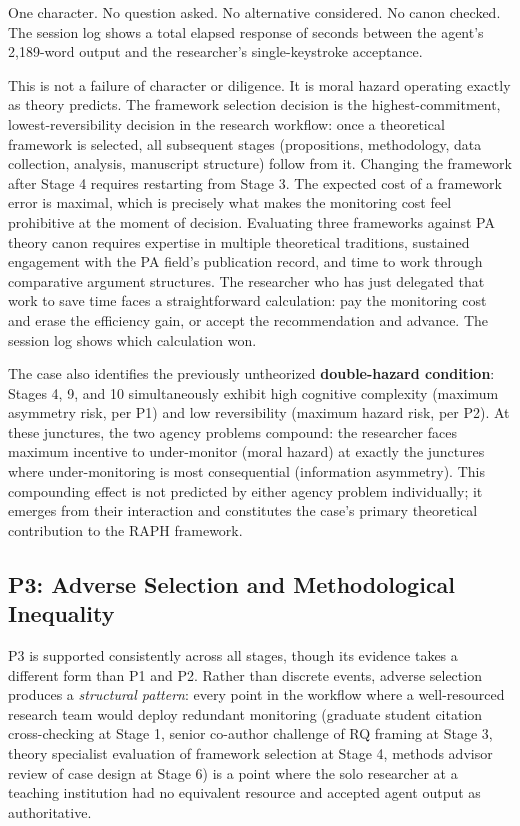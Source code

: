 \documentclass[12pt]{article}
\begin{document}
One character. No question asked. No alternative considered. No canon checked. The session
log shows a total elapsed response of seconds between the agent's 2,189-word output and
the researcher's single-keystroke acceptance.

This is not a failure of character or diligence. It is moral hazard operating exactly as
theory predicts. The framework selection decision is the highest-commitment,
lowest-reversibility decision in the research workflow: once a theoretical framework is
selected, all subsequent stages (propositions, methodology, data collection, analysis,
manuscript structure) follow from it. Changing the framework after Stage 4 requires
restarting from Stage 3. The expected cost of a framework error is maximal, which is
precisely what makes the monitoring cost feel prohibitive at the moment of decision.
Evaluating three frameworks against PA theory canon requires expertise in multiple
theoretical traditions, sustained engagement with the PA field's publication record, and time to
work through comparative argument structures. The researcher who has just delegated that
work to save time faces a straightforward calculation: pay the monitoring cost and erase
the efficiency gain, or accept the recommendation and advance. The session log shows which
calculation won.

The case also identifies the previously untheorized \textbf{double-hazard condition}:
Stages 4, 9, and 10 simultaneously exhibit high cognitive complexity (maximum asymmetry
risk, per P1) and low reversibility (maximum hazard risk, per P2). At these junctures,
the two agency problems compound: the researcher faces maximum incentive to under-monitor
(moral hazard) at exactly the junctures where under-monitoring is most consequential
(information asymmetry). This compounding effect is not predicted by either agency problem
individually; it emerges from their interaction and constitutes the case's primary
theoretical contribution to the RAPH framework.

\subsection{P3: Adverse Selection and Methodological Inequality}

P3 is supported consistently across all stages, though its evidence takes a different form
than P1 and P2. Rather than discrete events, adverse selection produces a \emph{structural
pattern}: every point in the workflow where a well-resourced research team would deploy
redundant monitoring (graduate student citation cross-checking at Stage 1, senior co-author
challenge of RQ framing at Stage 3, theory specialist evaluation of framework selection at
Stage 4, methods advisor review of case design at Stage 6) is a point where the solo
researcher at a teaching institution had no equivalent resource and accepted agent output
as authoritative.
\end{document}
